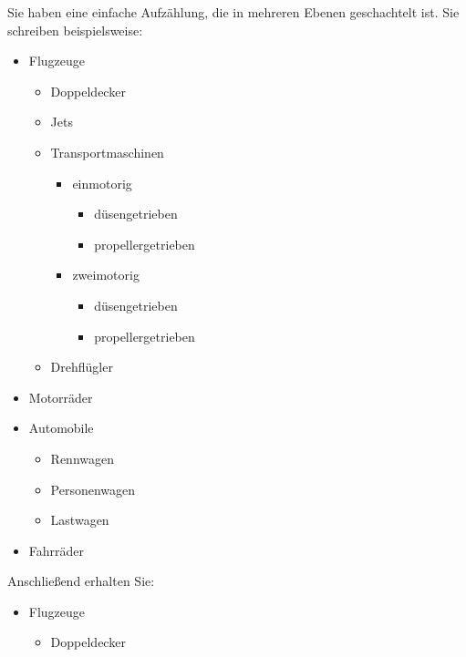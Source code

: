     \begin{Example}
      Sie haben eine einfache Aufzählung, die in mehreren Ebenen geschachtelt
      ist. Sie schreiben beispielsweise:
\begin{lstcode}
  \begin{itemize}
  \item Flugzeuge
    \begin{itemize}
    \item Doppeldecker
    \item Jets
    \item Transportmaschinen
      \begin{itemize}
      \item einmotorig
        \begin{itemize}
        \item{düsengetrieben}
        \item{propellergetrieben}
        \end{itemize}
      \item zweimotorig
        \begin{itemize}
        \item{düsengetrieben}
        \item{propellergetrieben}
        \end{itemize}
      \end{itemize}
    \item Drehflügler
    \end{itemize}
  \item Motorräder
  \item Automobile
    \begin{itemize}
    \item Rennwagen
    \item Personenwagen
    \item Lastwagen
    \end{itemize}
  \item Fahrräder
  \end{itemize}
 \end{lstcode}
      Anschließend erhalten Sie:%
      \begin{ShowOutput}[.5\baselineskip]
        \begin{itemize}
        \item Flugzeuge
          \begin{itemize}
          \item Doppeldecker

\end{itemize}
\end{itemize}
\end{ShowOutput}
\end{Example}
